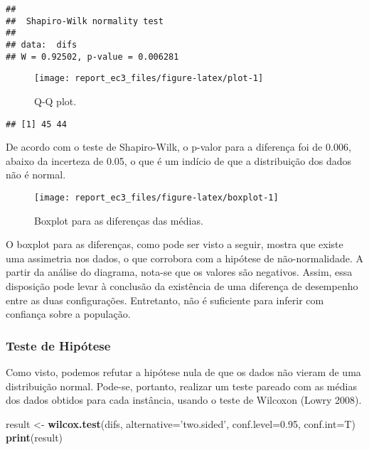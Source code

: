 \documentclass[]{article}
\newenvironment{Shaded}{\begin{snugshade}}{\end{snugshade}}
\newcommand{\DataTypeTok}[1]{\textcolor[rgb]{0.13,0.29,0.53}{#1}}
\newcommand{\FloatTok}[1]{\textcolor[rgb]{0.00,0.00,0.81}{#1}}
\newcommand{\KeywordTok}[1]{\textcolor[rgb]{0.13,0.29,0.53}{\textbf{#1}}}
\newcommand{\NormalTok}[1]{#1}
\newcommand{\StringTok}[1]{\textcolor[rgb]{0.31,0.60,0.02}{#1}}
\begin{document}
\begin{verbatim}
## 
##  Shapiro-Wilk normality test
## 
## data:  difs
## W = 0.92502, p-value = 0.006281
\end{verbatim}

\begin{figure}[H]

{\centering \texttt{[image: report\_ec3\_files/figure-latex/plot-1]} 

}

\caption{Q-Q plot.}\label{fig:plot}
\end{figure}

\begin{verbatim}
## [1] 45 44
\end{verbatim}

De acordo com o teste de Shapiro-Wilk, o p-valor para a diferença foi de
\(0.006\), abaixo da incerteza de 0.05, o que é um indício de que a
distribuição dos dados não é normal.

\begin{figure}[H]

{\centering \texttt{[image: report\_ec3\_files/figure-latex/boxplot-1]} 

}

\caption{Boxplot para as diferenças das médias.}\label{fig:boxplot}
\end{figure}

O boxplot para as diferenças, como pode ser visto a seguir, mostra que
existe uma assimetria nos dados, o que corrobora com a hipótese de
não-normalidade. A partir da análise do diagrama, nota-se que os valores
são negativos. Assim, essa disposição pode levar à conclusão da
existência de uma diferença de desempenho entre as duas configurações.
Entretanto, não é suficiente para inferir com confiança sobre a
população.

\hypertarget{teste-de-hipotese}{%
\subsubsection{Teste de Hipótese}\label{teste-de-hipotese}}

Como visto, podemos refutar a hipótese nula de que os dados não vieram
de uma distribuição normal. Pode-se, portanto, realizar um teste pareado
com as médias dos dados obtidos para cada instância, usando o teste de
Wilcoxon (Lowry 2008).

\begin{Shaded}
\begin{Highlighting}[]
\NormalTok{result <-}\StringTok{ }\KeywordTok{wilcox.test}\NormalTok{(difs, }\DataTypeTok{alternative=}\StringTok{'two.sided'}\NormalTok{, }\DataTypeTok{conf.level=}\FloatTok{0.95}\NormalTok{, }\DataTypeTok{conf.int=}\NormalTok{T)}
\KeywordTok{print}\NormalTok{(result)}
\end{Highlighting}
\end{Shaded}
\end{document}
